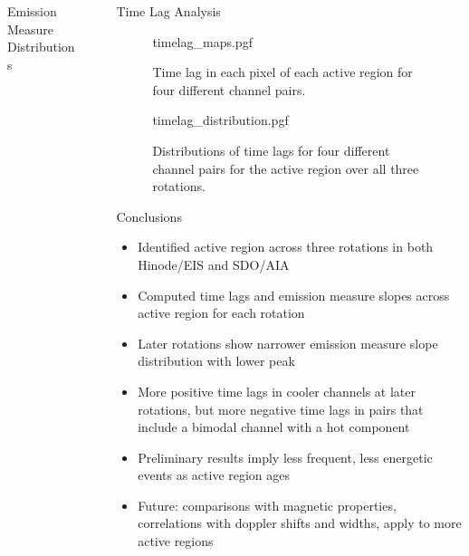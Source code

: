 \documentclass[final]{beamer}
\newlength{\sepwidth}
\newlength{\colwidth}
\newcommand{\separatorcolumn}{\begin{column}{\sepwidth}\end{column}}
\begin{document}
\begin{frame}[t]
\begin{columns}[t]
\begin{column}{\colwidth}
\begin{block}{Emission Measure Distributions}
  \end{block}

\end{column}

\separatorcolumn

\begin{column}{\colwidth}

  \begin{block}{Time Lag Analysis}

    \begin{figure}
      \centering
      {timelag_maps.pgf}
      \caption{Time lag in each pixel of each active region for four different channel pairs.}
      \label{fig:timelag_maps}
    \end{figure}

    \begin{figure}
      \centering
      {timelag_distribution.pgf}
      \caption{Distributions of time lags for four different channel pairs for the active region over all three rotations.}
      \label{fig:timelag_distribution}
    \end{figure}

  \end{block}

  \begin{block}{Conclusions}

    \begin{itemize}
      \item Identified active region across \alert{three rotations} in both Hinode/EIS and SDO/AIA
      \item Computed \alert{time lags} and \alert{emission measure slopes} across active region for each rotation
      \item Later rotations show \alert{narrower emission measure slope distribution with lower peak}
      \item \alert{More positive time lags} in cooler channels at later rotations, but \alert{more negative time lags} in pairs that include a bimodal channel with a hot component
      \item Preliminary results imply \alert{less frequent, less energetic events as active region ages}
      \item \alert{Future:} comparisons with magnetic properties, correlations with doppler shifts and widths, apply to more active regions
    \end{itemize}

  \end{block}


\end{column}
\end{columns}
\end{frame}
\end{document}

